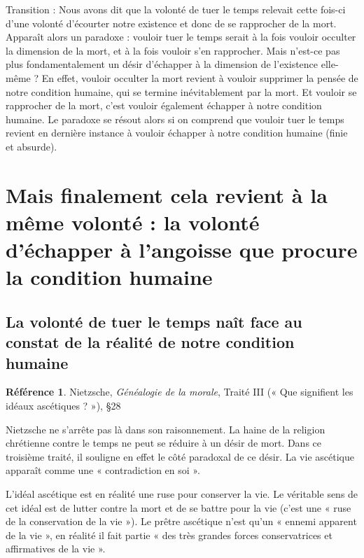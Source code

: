\documentclass[french]{book}
\theoremstyle{definition}
\newtheorem*{refe}{Référence}
\begin{document}
Transition :
Nous avons dit que la volonté de tuer le temps relevait cette fois-ci d’une volonté d’écourter notre existence et donc de se rapprocher de la mort. Apparaît alors un paradoxe : vouloir tuer le temps serait à la fois vouloir occulter la dimension de la mort, et à la fois vouloir s’en rapprocher. Mais n’est-ce pas plus fondamentalement un désir d’échapper à la dimension de l’existence elle-même ? En effet, vouloir occulter la mort revient à vouloir supprimer la pensée de notre condition humaine, qui se termine inévitablement par la mort. Et vouloir se rapprocher de la mort, c’est vouloir également échapper à notre condition humaine. Le paradoxe se résout alors si on comprend que vouloir tuer le temps revient en dernière instance à vouloir échapper à notre condition humaine (finie et absurde).

\section{Mais finalement cela revient à la même volonté : la volonté d’échapper à l’angoisse que procure la condition humaine}

\subsection{La volonté de tuer le temps naît face au constat de la réalité de notre condition humaine}

\begin{refe}
	Nietzsche, \textit{Généalogie de la morale}, Traité III (« Que signifient les idéaux ascétiques ? »), §28
\end{refe}

Nietzsche ne s’arrête pas là dans son raisonnement. La haine de la religion chrétienne contre le temps ne peut se réduire à un désir de mort. Dans ce troisième traité, il souligne en effet le côté paradoxal de ce désir. La vie ascétique apparaît comme une « contradiction en soi ».

L’idéal ascétique est en réalité une ruse pour conserver la vie. Le véritable sens de cet idéal est de lutter contre la mort et de se battre pour la vie (c’est une « ruse de la conservation de la vie »). Le prêtre ascétique n’est qu’un « ennemi apparent de la vie », en réalité il fait partie « des très grandes forces conservatrices et affirmatives de la vie ».
\end{document}
